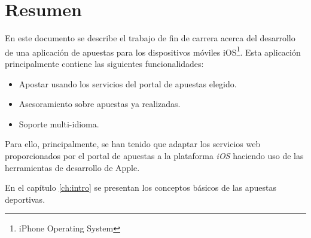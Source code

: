 \chapter*{Resumen}

En este documento se describe el trabajo de fin de carrera acerca del desarrollo de una aplicación de apuestas para los dispositivos móviles iOS\footnote{iPhone Operating System}. Esta aplicación principalmente contiene las siguientes funcionalidades:
\begin{itemize}
    \item Apostar usando los servicios del portal de apuestas elegido.
    \item Asesoramiento sobre apuestas ya realizadas.
    \item Soporte multi-idioma.
  \end{itemize}
       
      Para ello, principalmente, se han tenido que adaptar los servicios web proporcionados por el portal de apuestas a la plataforma \emph{iOS} haciendo uso de las herramientas de desarrollo de Apple.
       
     En el capítulo \ref{ch:intro} se presentan los conceptos básicos
    de las apuestas deportivas.

